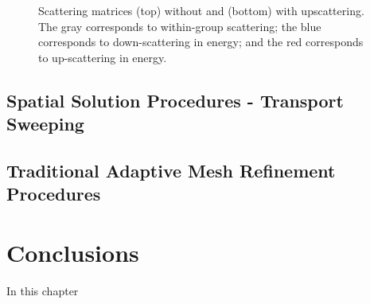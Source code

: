 \begin{figure}
\begin{subfigure}[b]{0.58\textwidth}
	\end{subfigure}
\caption[Scattering matrices with and without upscattering]{Scattering matrices (top) without and (bottom) with upscattering. The gray corresponds to within-group scattering; the blue corresponds to down-scattering in energy; and the red corresponds to up-scattering in energy.}
\label{fig::Sn_Solution_Iterative_scattmatrix}
\end{figure}

\subsection{Spatial Solution Procedures - Transport Sweeping}
\label{sec::Sn_Solution_Sweeping}

\subsection{Traditional Adaptive Mesh Refinement Procedures}
\label{sec::Sn_Solution_AMR}


\section{Conclusions}
\label{sec::Sn_Conclusions}

In this chapter